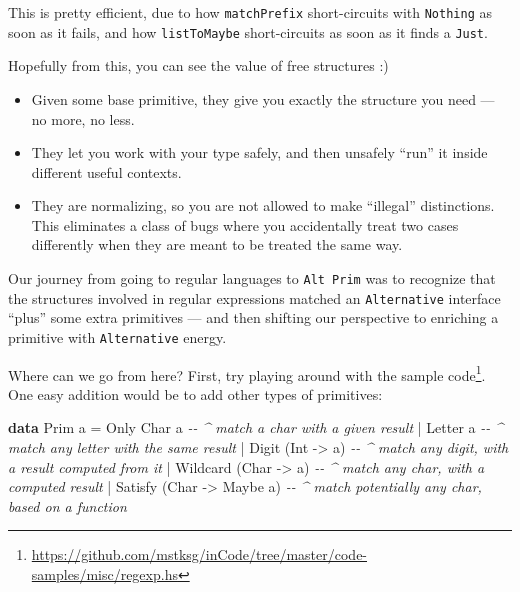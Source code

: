 \documentclass[]{article}
\newenvironment{Shaded}{}{}
\newcommand{\CommentTok}[1]{\textcolor[rgb]{0.38,0.63,0.69}{\textit{#1}}}
\newcommand{\DataTypeTok}[1]{\textcolor[rgb]{0.56,0.13,0.00}{#1}}
\newcommand{\KeywordTok}[1]{\textcolor[rgb]{0.00,0.44,0.13}{\textbf{#1}}}
\newcommand{\NormalTok}[1]{#1}
\newcommand{\OperatorTok}[1]{\textcolor[rgb]{0.40,0.40,0.40}{#1}}
\newcommand{\OtherTok}[1]{\textcolor[rgb]{0.00,0.44,0.13}{#1}}
\renewcommand{\href}[2]{#2\footnote{\url{#1}}}
\begin{document}
This is pretty efficient, due to how \texttt{matchPrefix} short-circuits with
\texttt{Nothing} as soon as it fails, and how \texttt{listToMaybe}
short-circuits as soon as it finds a \texttt{Just}.

Hopefully from this, you can see the value of free structures :)

\begin{itemize}
\tightlist
\item
  Given some base primitive, they give you exactly the structure you need --- no
  more, no less.
\item
  They let you work with your type safely, and then unsafely ``run'' it inside
  different useful contexts.
\item
  They are normalizing, so you are not allowed to make ``illegal'' distinctions.
  This eliminates a class of bugs where you accidentally treat two cases
  differently when they are meant to be treated the same way.
\end{itemize}

Our journey from going to regular languages to \texttt{Alt\ Prim} was to
recognize that the structures involved in regular expressions matched an
\texttt{Alternative} interface ``plus'' some extra primitives --- and then
shifting our perspective to enriching a primitive with \texttt{Alternative}
energy.

Where can we go from here? First, try playing around with the
\href{https://github.com/mstksg/inCode/tree/master/code-samples/misc/regexp.hs}{sample
code}. One easy addition would be to add other types of primitives:

\begin{Shaded}
\begin{Highlighting}[]
\KeywordTok{data} \DataTypeTok{Prim}\NormalTok{ a }\OtherTok{=}
    \DataTypeTok{Only} \DataTypeTok{Char}\NormalTok{ a                 }\CommentTok{{-}{-} \^{} match a char with a given result}
  \OperatorTok{|} \DataTypeTok{Letter}\NormalTok{ a                    }\CommentTok{{-}{-} \^{} match any letter with the same result}
  \OperatorTok{|} \DataTypeTok{Digit}\NormalTok{    (}\DataTypeTok{Int}  \OtherTok{{-}\textgreater{}}\NormalTok{ a)        }\CommentTok{{-}{-} \^{} match any digit, with a result computed from it}
  \OperatorTok{|} \DataTypeTok{Wildcard}\NormalTok{ (}\DataTypeTok{Char} \OtherTok{{-}\textgreater{}}\NormalTok{ a)        }\CommentTok{{-}{-} \^{} match any char, with a computed result}
  \OperatorTok{|} \DataTypeTok{Satisfy}\NormalTok{ (}\DataTypeTok{Char} \OtherTok{{-}\textgreater{}} \DataTypeTok{Maybe}\NormalTok{ a)   }\CommentTok{{-}{-} \^{} match potentially any char, based on a function}
\end{Highlighting}
\end{Shaded}
\end{document}
